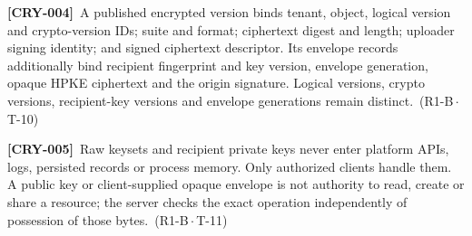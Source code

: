 \documentclass[11pt,a4paper]{article}
\newcommand{\reqtag}[2]{{\footnotesize\color{accent}(#1\,$\cdot$\,#2)}}
\newcommand{\req}[4]{\par\noindent\hypertarget{req:#1}{\textbf{[#1]}}\ #4\ \reqtag{#2}{#3}\par}
\begin{document}
\req{CRY-004}{R1-B}{T-10}{A published encrypted version binds tenant, object, logical version and crypto-version IDs; suite and format; ciphertext digest and length; uploader signing identity; and signed ciphertext descriptor. Its envelope records additionally bind recipient fingerprint and key version, envelope generation, opaque HPKE ciphertext and the origin signature. Logical versions, crypto versions, recipient-key versions and envelope generations remain distinct.}
\req{CRY-005}{R1-B}{T-11}{Raw keysets and recipient private keys never enter platform APIs, logs, persisted records or process memory. Only authorized clients handle them. A public key or client-supplied opaque envelope is not authority to read, create or share a resource; the server checks the exact operation independently of possession of those bytes.}
\end{document}
